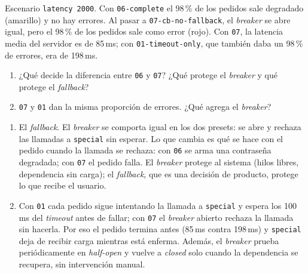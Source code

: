 \documentclass[variant=guia,cover=institutional,mode=screen]{ua-engineering-v6-article}
\begin{document}
\begin{uaexercise}
Escenario \texttt{latency 2000}. Con \texttt{06-complete} el 98\,\% de los pedidos sale degradado (amarillo) y no hay errores. Al pasar a \texttt{07-cb-no-fallback}, el \emph{breaker} se abre igual, pero el 98\,\% de los pedidos sale como error (rojo). Con \texttt{07}, la latencia media del servidor es de 85\,ms; con \texttt{01-timeout-only}, que también daba un 98\,\% de errores, era de 198\,ms.
\begin{enumerate}
\item ¿Qué decide la diferencia entre \texttt{06} y \texttt{07}? ¿Qué protege el \emph{breaker} y qué protege el \emph{fallback}?
\item \texttt{07} y \texttt{01} dan la misma proporción de errores. ¿Qué agrega el \emph{breaker}?
\end{enumerate}
\end{uaexercise}
\begin{uaanswer}
\begin{enumerate}
\item El \emph{fallback}. El \emph{breaker} se comporta igual en los dos presets: se abre y rechaza las llamadas a \texttt{special} sin esperar. Lo que cambia es qué se hace con el pedido cuando la llamada se rechaza: con \texttt{06} se arma una contraseña degradada; con \texttt{07} el pedido falla. El \emph{breaker} protege al sistema (hilos libres, dependencia sin carga); el \emph{fallback}, que es una decisión de producto, protege lo que recibe el usuario.
\item Con \texttt{01} cada pedido sigue intentando la llamada a \texttt{special} y espera los 100\,ms del \emph{timeout} antes de fallar; con \texttt{07} el \emph{breaker} abierto rechaza la llamada sin hacerla. Por eso el pedido termina antes (85\,ms contra 198\,ms) y \texttt{special} deja de recibir carga mientras está enferma. Además, el \emph{breaker} prueba periódicamente en \emph{half-open} y vuelve a \emph{closed} solo cuando la dependencia se recupera, sin intervención manual.
\end{enumerate}
\end{uaanswer}
\end{document}
